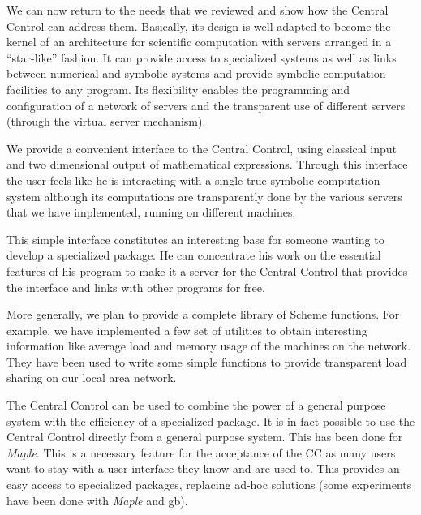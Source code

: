 \documentclass {article}
\begin{document}
We can now return to  the needs that we reviewed and show how the Central
Control can address them. Basically, its design is well adapted to become the
kernel of an architecture for scientific computation with servers arranged in
a ``star-like'' fashion. 
It can provide access to specialized systems as well as links between
numerical and symbolic systems and provide symbolic computation facilities to
any program. 
Its flexibility enables the programming and configuration of a network of
servers and the transparent use of different servers (through the virtual
server mechanism).

We provide a convenient interface to the Central Control, using classical
input and two dimensional output of mathematical expressions.
Through this 
interface the user feels like he is interacting with a single true symbolic
computation system although its computations are transparently done by the
various servers that we have implemented, running on different machines.

This simple interface constitutes an interesting base for someone wanting to
develop a specialized package. He can concentrate his work on the essential
features of his program to make it a server for the Central Control that
provides the interface and links with other programs for free.

More generally, we plan to provide a complete library of Scheme
functions. 
For example, we have implemented a few set of utilities to obtain interesting
information like average load and memory usage of the machines on the
network. They have been used to write some simple functions to provide
transparent load sharing on our local area network.

The Central Control can be used to combine the power of a general purpose
system with the efficiency of a specialized package.
It is in fact possible to use the Central Control directly from a general 
purpose system. This has been done for {\sl Maple}. This is a
necessary feature for the acceptance of the CC as many users want to stay
with a user interface they know and are used to. This provides an easy access
to specialized packages, replacing ad-hoc solutions (some experiments have
been done with {\sl Maple} and {\sc gb}). 

\end{document}
